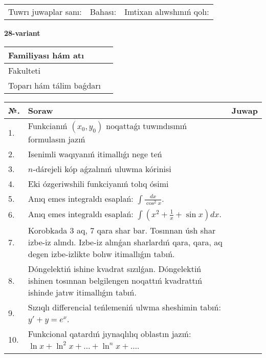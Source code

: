 \documentclass{article}
\begin{document}
\vspace{1cm}

\begin{tabular}{ c c c }
Tuwrı juwaplar sanı: \underline{\hspace{2cm}} & Bahası: \underline{\hspace{2cm}} & Imtixan alıwshınıń qolı: \underline{\hspace{2cm}} \\
\end{tabular}

\newpage

\begin{center}\textbf{28-variant}\end{center}

\bgroup
\def\arraystretch{1.5}
\begin{tabular}{ |m{6cm}|m{10cm}| }
  \hline
  Familiyası hám atı & \\
  \hline
  Fakulteti &\\
  \hline
  Toparı hám tálim baǵdarı & \\
  \hline
\end{tabular}
\egroup

\vspace{0.5cm}

\bgroup
\def\arraystretch{2}
\begin{tabular}{ |l|m{8cm}|m{7cm}| }
  \hline
  №. & Soraw & Juwap \\
  \hline
  1. & Funkcianıń $(x_{0}, y_{0})$ noqattaǵı tuwındısınıń formulasın jazıń &  \\
  \hline
  2. & Isenimli waqıyanıń itimallıǵı nege teń &  \\
  \hline
  3. & $n$-dárejeli kóp aǵzalınıń uluwma kórinisi &  \\
  \hline
  4. & Eki ózgeriwshili funkciyanıń tolıq ósimi &  \\
  \hline
  5. & Anıq emes integraldı esaplań: $\displaystyle\int \frac{dx}{\cos^{2}x}$. &  \\
  \hline
  6. & Anıq emes integraldı esaplań: $\displaystyle\int(x^{2}+\frac{1}{x} + \sin x)dx$. &  \\
  \hline
  7. & Korobkada 3 aq, 7 qara shar bar. Tosınnan úsh shar izbe-iz alındı. Izbe-iz alınǵan sharlardıń qara, qara, aq degen izbe-izlikte bolıw itimallıǵın tabıń. &  \\
  \hline
  8. & Dóngelektiń ishine kvadrat sızılǵan. Dóngelektiń ishinen tosınnan belgilengen noqattıń kvadrattıń ishinde jatıw itimallıǵın tabıń. &  \\
  \hline
  9. & Sızıqlı differencial teńlemeniń ulwma sheshimin tabıń: $y' + y =e^{x}$. &  \\
  \hline
  10. & Funkcional qatardıń jıynaqlılıq oblastın jazıń: $\ln x + \ln^{2}x + \ldots + \ln^{n}x + \ldots$. &  \\
  \hline
\end{tabular}
\egroup
\end{document}
